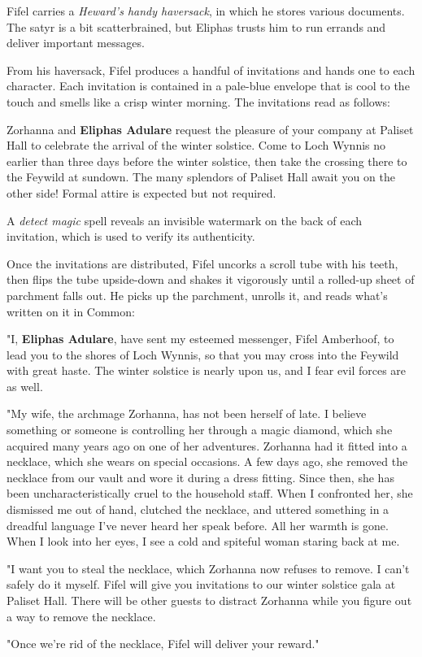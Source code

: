 \documentclass[10pt,a4paper,twoside,bg=print,twocolumn,openany,nodeprecatedcode]{dndbook}
\begin{document}
Fifel carries a \textit{Heward's handy haversack}, in which he stores various documents. The satyr is a bit scatterbrained, but Eliphas trusts him to run errands and deliver important messages.

From his haversack, Fifel produces a handful of invitations and hands one to each character. Each invitation is contained in a pale-blue envelope that is cool to the touch and smells like a crisp winter morning. The invitations read as follows:

\begin{DndReadAloud}{}
Zorhanna and \textbf{Eliphas Adulare} request the pleasure of your company at Paliset Hall to celebrate the arrival of the winter solstice. Come to Loch Wynnis no earlier than three days before the winter solstice, then take the crossing there to the Feywild at sundown. The many splendors of Paliset Hall await you on the other side! Formal attire is expected but not required.

\end{DndReadAloud}

A \textit{detect magic} spell reveals an invisible watermark on the back of each invitation, which is used to verify its authenticity.

Once the invitations are distributed, Fifel uncorks a scroll tube with his teeth, then flips the tube upside-down and shakes it vigorously until a rolled-up sheet of parchment falls out. He picks up the parchment, unrolls it, and reads what's written on it in Common:

\begin{DndReadAloud}{}
"I, \textbf{Eliphas Adulare}, have sent my esteemed messenger, Fifel Amberhoof, to lead you to the shores of Loch Wynnis, so that you may cross into the Feywild with great haste. The winter solstice is nearly upon us, and I fear evil forces are as well.

"My wife, the archmage Zorhanna, has not been herself of late. I believe something or someone is controlling her through a magic diamond, which she acquired many years ago on one of her adventures. Zorhanna had it fitted into a necklace, which she wears on special occasions. A few days ago, she removed the necklace from our vault and wore it during a dress fitting. Since then, she has been uncharacteristically cruel to the household staff. When I confronted her, she dismissed me out of hand, clutched the necklace, and uttered something in a dreadful language I've never heard her speak before. All her warmth is gone. When I look into her eyes, I see a cold and spiteful woman staring back at me.

"I want you to steal the necklace, which Zorhanna now refuses to remove. I can't safely do it myself. Fifel will give you invitations to our winter solstice gala at Paliset Hall. There will be other guests to distract Zorhanna while you figure out a way to remove the necklace.

"Once we're rid of the necklace, Fifel will deliver your reward."

\end{DndReadAloud}
\end{document}
